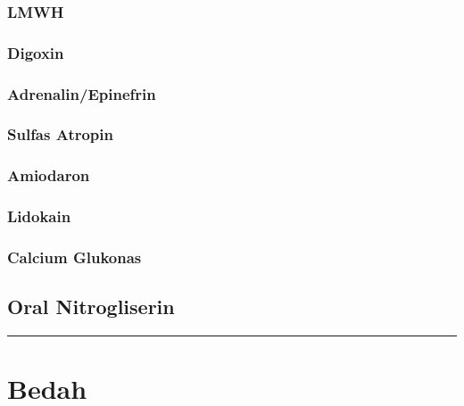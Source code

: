 \documentclass[
]{book}
\begin{document}
\hypertarget{lmwh}{%
\subsubsection{LMWH}\label{lmwh}}

\hypertarget{digoxin}{%
\subsubsection{Digoxin}\label{digoxin}}

\hypertarget{adrenalinepinefrin}{%
\subsubsection{Adrenalin/Epinefrin}\label{adrenalinepinefrin}}

\hypertarget{sulfas-atropin}{%
\subsubsection{Sulfas Atropin}\label{sulfas-atropin}}

\hypertarget{amiodaron}{%
\subsubsection{Amiodaron}\label{amiodaron}}

\hypertarget{lidokain}{%
\subsubsection{Lidokain}\label{lidokain}}

\hypertarget{calcium-glukonas}{%
\subsubsection{Calcium Glukonas}\label{calcium-glukonas}}

\hypertarget{oral-nitrogliserin}{%
\subsection{Oral Nitrogliserin}\label{oral-nitrogliserin}}

\begin{center}\rule{0.5\linewidth}{0.5pt}\end{center}

\hypertarget{bedah-1}{%
\section{Bedah}\label{bedah-1}}
\end{document}
